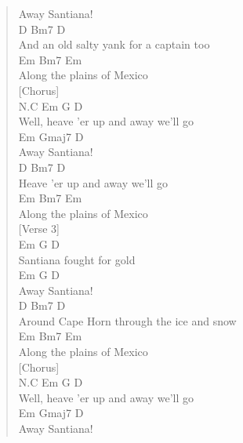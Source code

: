 \documentclass[11pt]{article}
\begin{document}
\begin{verse}
Away Santiana!\\
\hspace*{7em}D                    Bm7     D\\
And an old salty yank for a captain too\\
\hspace*{1em}Em       Bm7       Em\\
Along the plains of Mexico\\
\vspace*{1em}
\vspace*{1em}
[Chorus]\\
N.C Em                  G         D\\
Well, heave 'er up and away we'll go\\
\hspace*{1em}Em     Gmaj7 D\\
Away Santiana!\\
D                  Bm7        D\\
\hspace*{1em}Heave 'er up and away we'll go\\
\hspace*{1em}Em       Bm7       Em\\
Along the plains of Mexico\\
\vspace*{1em}
\vspace*{1em}
[Verse 3]\\
Em       G          D\\
Santiana fought for gold\\
\hspace*{1em}Em       G D\\
Away Santiana!\\
D                            Bm7     D\\
Around Cape Horn through the ice and snow\\
\hspace*{1em}Em       Bm7       Em\\
Along the plains of Mexico\\
\vspace*{1em}
\vspace*{1em}
[Chorus]\\
N.C Em                  G         D\\
Well, heave 'er up and away we'll go\\
\hspace*{1em}Em     Gmaj7 D\\
Away Santiana!\\

\end{verse}
\end{document}
